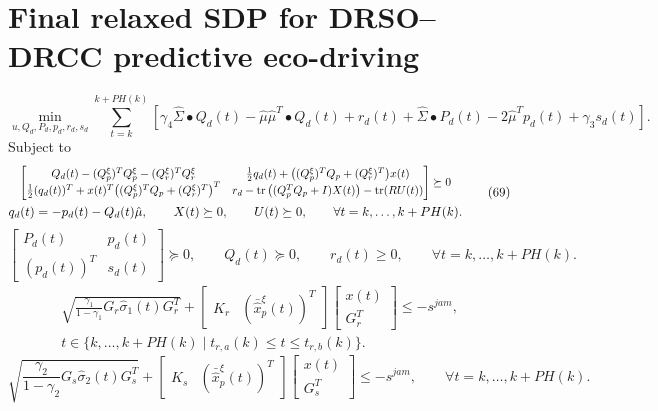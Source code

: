\documentclass[10pt]{article}
\begin{document}
\section*{Final relaxed SDP for DRSO--DRCC predictive eco-driving}
\begin{equation}
\min_{u,Q_d,P_d,p_d,r_d,s_d}\sum_{t=k}^{k+PH(k)}
\left[\gamma_4\hat\Sigma\bullet Q_d(t)-\hat\mu\hat\mu^T\bullet Q_d(t)+r_d(t)+\hat\Sigma\bullet P_d(t)-2\hat\mu^Tp_d(t)+\gamma_3s_d(t)\right].
\tag{68}
\end{equation}
Subject to
\begin{equation}
\begin{gathered}
\resizebox{0.98\textwidth}{!}{$\displaystyle
\begin{bmatrix}
Q_d(t)-(Q_p^\xi)^TQ_p^\xi-(Q_r^\xi)^TQ_r^\xi &
\frac12q_d(t)+\big((Q_p^\xi)^TQ_p+(Q_r^\xi)^T\big)x(t)\\
\frac12(q_d(t))^T+x(t)^T\big((Q_p^\xi)^TQ_p+(Q_r^\xi)^T\big)^T &
r_d-\operatorname{tr}\big((Q_p^TQ_p+I)X(t)\big)-\operatorname{tr}(RU(t))
\end{bmatrix}\succeq0$}\\
q_d(t)=-p_d(t)-Q_d(t)\hat\mu,\qquad X(t)\succeq0,\qquad U(t)\succeq0,
\qquad\forall t=k,\ldots,k+PH(k).
\end{gathered}
\tag{69}
\end{equation}
\begin{equation}
\begin{bmatrix}P_d(t)&p_d(t)\\(p_d(t))^T&s_d(t)\end{bmatrix}\succeq0,
\qquad Q_d(t)\succeq0,\qquad r_d(t)\geq0,
\qquad\forall t=k,\ldots,k+PH(k).
\tag{70}
\end{equation}
\begin{equation}
\begin{gathered}
\sqrt{\frac{\gamma_1}{1-\gamma_1}G_r\hat\sigma_1(t)G_r^T}
+\begin{bmatrix}K_r&(\bar{\hat{x}}_p^\xi(t))^T\end{bmatrix}
\begin{bmatrix}x(t)\\G_r^T\end{bmatrix}\leq-s^{jam},\\
t\in\{k,\ldots,k+PH(k)\mid t_{r,a}(k)\leq t\leq t_{r,b}(k)\}.
\end{gathered}
\tag{71}
\end{equation}
\begin{equation}
\sqrt{\frac{\gamma_2}{1-\gamma_2}G_s\hat\sigma_2(t)G_s^T}
+\begin{bmatrix}K_s&(\bar{\hat{x}}_p^\xi(t))^T\end{bmatrix}
\begin{bmatrix}x(t)\\G_s^T\end{bmatrix}\leq-s^{jam},
\qquad\forall t=k,\ldots,k+PH(k).
\tag{72}
\end{equation}
\end{document}
